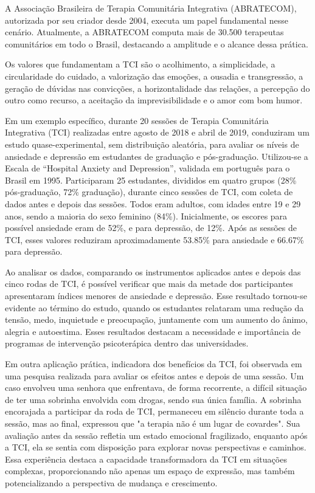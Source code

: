 A Associação Brasileira de Terapia Comunitária Integrativa (ABRATECOM), autorizada por seu criador desde 2004, executa um papel fundamental nesse cenário. Atualmente, a ABRATECOM computa mais de 30.500 terapeutas comunitários em todo o Brasil, destacando a amplitude e o alcance dessa prática.\cite{SILVAFRANCO}

Os valores que fundamentam a TCI são o acolhimento, a simplicidade, a circularidade do cuidado, a valorização das emoções, a ousadia e transgressão, a geração de dúvidas nas convicções, a horizontalidade das relações, a percepção do outro como recurso, a aceitação da imprevisibilidade e o amor com bom humor.\cite{SILVA}

Em um exemplo específico, durante 20 sessões de Terapia Comunitária Integrativa (TCI) realizadas entre agosto de 2018 e abril de 2019, \cite{BOARETTO} conduziram um estudo quase-experimental, sem distribuição aleatória, para avaliar os níveis de ansiedade e depressão em estudantes de graduação e pós-graduação. Utilizou-se a Escala de “Hospital Anxiety and Depression”, validada em português para o Brasil em 1995. Participaram 25 estudantes, divididos em quatro grupos (28\% pós-graduação, 72\% graduação), durante cinco sessões de TCI, com coleta de dados antes e depois das sessões. Todos eram adultos, com idades entre 19 e 29 anos, sendo a maioria do sexo feminino (84\%). Inicialmente, os escores para possível ansiedade eram de 52\%, e para depressão, de 12\%. Após as sessões de TCI, esses valores reduziram aproximadamente 53.85\% para ansiedade e 66.67\% para depressão.

Ao analisar os dados, comparando os instrumentos aplicados antes e depois das cinco rodas de TCI, é possível verificar que mais da metade dos participantes apresentaram índices menores de ansiedade e depressão. Esse resultado tornou-se evidente ao término do estudo, quando os estudantes relataram uma redução da tensão, medo, inquietude e preocupação, juntamente com um aumento do ânimo, alegria e autoestima. Esses resultados destacam a necessidade e importância de programas de intervenção psicoterápica dentro das universidades.\cite{BOARETTO}

Em outra aplicação prática, indicadora dos benefícios da TCI, foi observada em uma pesquisa realizada para avaliar os efeitos antes e depois de uma sessão. Um caso envolveu uma senhora que enfrentava, de forma recorrente, a difícil situação de ter uma sobrinha envolvida com drogas, sendo sua única família. A sobrinha encorajada a participar da roda de TCI, permaneceu em silêncio durante toda a sessão, mas ao final, expressou que "a terapia não é um lugar de covardes". Sua avaliação antes da sessão refletia um estado emocional fragilizado, enquanto após a TCI, ela se sentia com disposição para explorar novas perspectivas e caminhos. Essa experiência destaca a capacidade transformadora da TCI em situações complexas, proporcionando não apenas um espaço de expressão, mas também potencializando a perspectiva de mudança e crescimento. \cite{LEITEePALOS}


